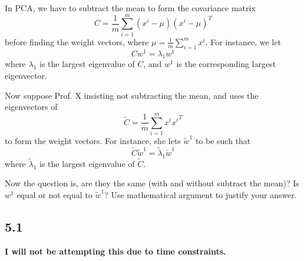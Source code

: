 \documentclass[twoside,10pt]{article}
\begin{document}
In PCA, we have to subtract the mean to form the covariance matrix 
\[
C = \frac 1 m \sum_{i=1}^m (x^i - \mu)(x^i - \mu)^T 
\]
before finding the weight vectors, where $\mu = \frac 1m \sum_{i=1}^m x^i$. For instance, we let
\[
 C w^1= \lambda_1 w^1
\]
where $\lambda_1$ is the largest eigenvalue of $C$, and $w^1$ is the corresponding largest eigenvector.  

Now suppose Prof. X insisting not subtracting the mean, and uses the eigenvectors of 
\[
\tilde C = \frac 1 m \sum_{i=1}^m x^i {x^i}^T
\]
to form the weight vectors. For instance, she lets $\tilde w^1$ to be such that 
\[
\tilde C \tilde w^1 = \tilde \lambda_1 \tilde w^1
\]
where $\tilde \lambda_1$ is the largest eigenvalue of $\tilde C$. 

Now the question is, are they the same (with and without subtract the mean)? Is $w^1$ equal or not equal to $\tilde w^1$? Use mathematical argument to justify your answer.

\subsection*{5.1}
\textbf{I will not be attempting this due to time constraints.}

\printbibliography
\end{document}
